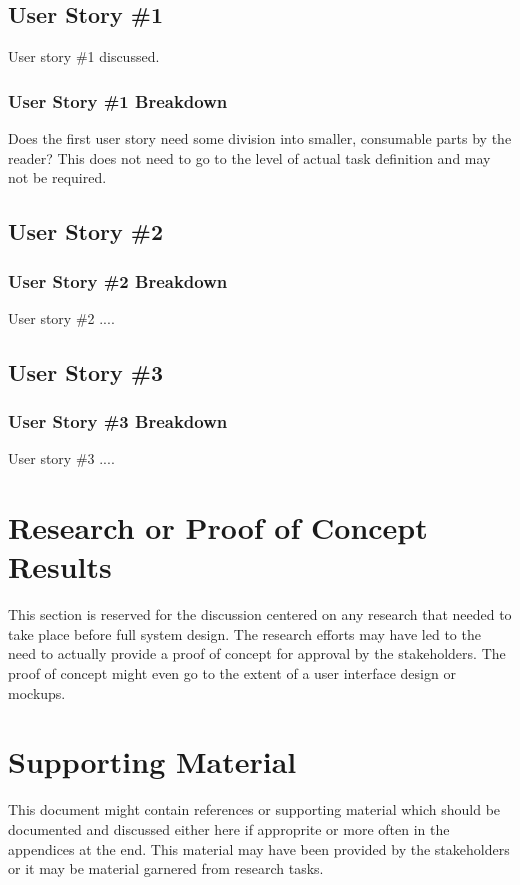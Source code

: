 \subsection{User Story \#1}
User story \#1 discussed. 

\subsubsection{User Story \#1 Breakdown}
Does the first user story need some division into smaller, consumable parts by 
the reader?  This does not need to go to the level of actual task definition and 
may not be required. 

\subsection{User Story \#2} 

\subsubsection{User Story \#2 Breakdown}
User story \#2  .... 

\subsection{User Story \#3} 

\subsubsection{User Story \#3 Breakdown}
User story \#3  .... 


\section{Research or Proof of Concept Results}
This section is reserved for the discussion centered on any research that needed 
to take place before full system design.  The research efforts may have led to 
the need to actually provide a proof of concept for approval by the stakeholders. 
 The proof of concept might even go to the extent of a user interface design or 
mockups. 


\section{Supporting Material}


This document might contain references or supporting material which should be documented 
and discussed  either here if approprite or more often in the appendices at the end.  This material may have been provided by the stakeholders  
or it may be material garnered from research tasks.

